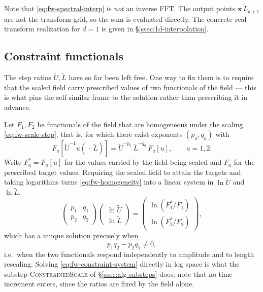Note that \eqref{eq:fw-spectral-interp} is \emph{not} an inverse FFT. The
output points $\mathbf{x}\,\tilde{L}_{k+1}$ are not the transform grid, so the
sum is evaluated directly. The concrete real-transform realization for $d = 1$
is given in \S\ref{ssec:1d-interpolation}.

\subsection{Constraint functionals}\label{ssec:fw-constraints}

The step ratios $\tilde{U}, \tilde{L}$ have so far been left free. One way to
fix them is to require that the scaled field carry prescribed values of two
functionals of the field --- this is what pins the self-similar frame to the
solution rather than prescribing it in advance.

Let $F_1, F_2$ be functionals of the field that are homogeneous under the
scaling \eqref{eq:fw-scale-step}, that is, for which there exist exponents
$(p_a, q_a)$ with
\begin{equation}\label{eq:fw-homogeneity}
  F_a\!\left[ \tilde{U}^{-1} u(\,\cdot\, \tilde{L}) \right]
  = \tilde{U}^{-p_a}\, \tilde{L}^{-q_a}\, F_a[u],
  \qquad a = 1, 2 .
\end{equation}
Write $F_a^* = F_a[u]$ for the values carried by the field being scaled and
$F_a$ for the prescribed target values. Requiring the scaled field to attain
the targets and taking logarithms turns \eqref{eq:fw-homogeneity} into a
linear system in $\ln \tilde{U}$ and $\ln \tilde{L}$,
\begin{equation}\label{eq:fw-constraint-system}
  \begin{pmatrix} p_1 & q_1 \\ p_2 & q_2 \end{pmatrix}
  \begin{pmatrix} \ln \tilde{U} \\ \ln \tilde{L} \end{pmatrix}
  =
  \begin{pmatrix} \ln (F_1^*/F_1) \\ \ln (F_2^*/F_2) \end{pmatrix},
\end{equation}
which has a unique solution precisely when
\begin{equation}\label{eq:fw-constraint-solvable}
  p_1 q_2 - p_2 q_1 \neq 0,
\end{equation}
i.e.\ when the two functionals respond independently to amplitude and to
length rescaling. Solving \eqref{eq:fw-constraint-system} directly in log
space is what the substep \textsc{ConstrainedScale} of
\S\ref{ssec:alg-substeps} does; note that no time increment enters, since the
ratios are fixed by the field alone.

